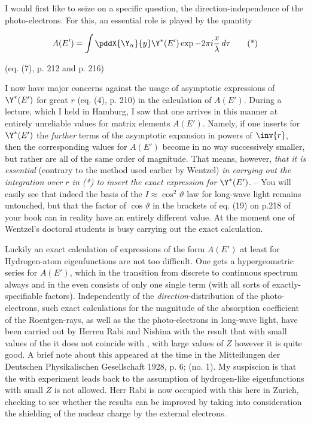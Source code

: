 \documentclass{article}
\newcommand{\nequ}[2]{
\begin{align*}
#1
\tag{#2}
\end{align*}
}
\begin{document}
I would first like to seize on a specific question, the direction-independence of the photo-electrons. For this, an essential role is played by the quantity
\nequ{
A(E') = \int \pddX{\Y_\alpha}{y} \Y^*(E') \exp{-2\pi i \frac{x}{\lambda}}\, d\tau
}{*}
(eq. (7), p. 212 and p. 216)

I now have major concerns against the usage of asymptotic expressions of $\Y^*(E')$ for great $r$ (eq. (4), p. 210) in the calculation of $A(E')$. During a lecture, which I held in Hamburg, I saw that one arrives in this manner at entirely unreliable values for matrix elements  $A(E')$. Namely, if one inserts for $\Y^*(E')$ the \textit{further} terms of the asymptotic expansion in powers of $\inv{r}$, then the corresponding values for $A(E')$ become in no way successively smaller, but rather are all of the same order of magnitude. That means, however, \textit{that it is essential} (contrary to the method used earlier by Wentzel) \textit{in carrying out the integration over $r$ in (*) to insert the exact expression for $\Y^*(E')$}. -- You will easily see that indeed the basis of the $I \approx \cos^2{\vartheta}$ law for long-wave light remains untouched, but that the factor of $\cos{\vartheta}$ in the brackets of eq. (19) on p.218 of your book can in reality have an entirely different value. At the moment one of Wentzel's doctoral students is busy carrying out the exact calculation.

Luckily an exact calculation of expressions of the form $A(E')$ at least for Hydrogen-atom eigenfunctions are not too difficult. One gets a hypergeometric series for $A(E')$, which in the transition from discrete to continuous spectrum always  and in the  even consists of only one single term (with all sorts of exactly-specifiable factors). Independently of the \textit{direction}-distribution of the photo-electrons, such exact calculations for the magnitude of the absorption coefficient of the Roentgen-rays, as well as the  the photo-electrons in long-wave light, have been carried out by Herren Rabi and Nishina with the result that with small values of the  it does not coincide with , with large values of $Z$ however it is quite good. A brief note about this appeared at the time in the Mitteilungen der Deutschen Physikalischen Gesellschaft 1928, p. 6; (no. 1). My suspiscion is that the  with experiment leads back to the assumption of hydrogen-like eigenfunctions with small $Z$ is not allowed. Herr Rabi is now occupied with this here in Zurich, checking to see whether the results can be improved by taking into consideration the shielding of the nuclear charge by the external electrons.
\end{document}
